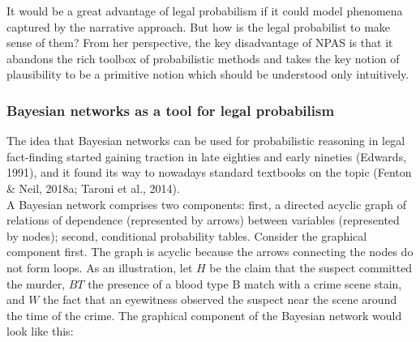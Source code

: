 \documentclass[11pt,dvipsnames,enabledeprecatedfontcommands]{scrartcl}
\begin{document}
It would be a great advantage of legal probabilism if it could model
phenomena captured by the narrative approach. But how is the legal
probabilist to make sense of them? From her perspective, the key
disadvantage of NPAS is that it abandons the rich toolbox of
probabilistic methods and takes the key notion of plausibility to be a
primitive notion which should be understood only intuitively.

\hypertarget{bayesian-networks-as-a-tool-for-legal-probabilism}{%
\subsubsection{Bayesian networks as a tool for legal
probabilism}\label{bayesian-networks-as-a-tool-for-legal-probabilism}}

The idea that Bayesian networks can be used for probabilistic reasoning
in legal fact-finding started gaining traction in late eighties and
early nineties (Edwards, 1991), and it found its way to nowadays
standard textbooks on the topic (Fenton \& Neil, 2018a; Taroni et al.,
2014).\\
A Bayesian network comprises two components: first, a directed acyclic
graph of relations of dependence (represented by arrows) between
variables (represented by nodes); second, conditional probability
tables. Consider the graphical component first. The graph is acyclic
because the arrows connecting the nodes do not form loops. As an
illustration, let \(H\) be the claim that the suspect committed the
murder, \(BT\) the presence of a blood type B match with a crime scene
stain, and \(W\) the fact that an eyewitness observed the suspect near
the scene around the time of the crime. The graphical component of the
Bayesian network would look like this:

\noindent
\end{document}
